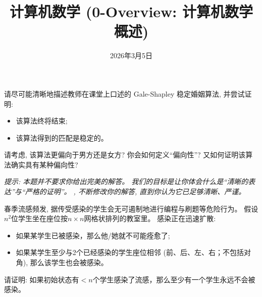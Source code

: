 \documentclass[a4paper, justified]{tufte-handout}
\title{计算机数学 (0-Overview: 计算机数学概述)}
\date{2026年3月5日}
\begin{document}
\maketitle
\noplagiarism %
\begin{abstract}
  \begin{center}{}
  \end{center}
\end{abstract}
\beginrequired
\begin{problem}[稳定婚姻问题]
  请尽可能清晰地描述教师在课堂上口述的 Gale-Shapley 稳定婚姻算法, 并尝试证明:
  \begin{itemize}
    \item 该算法终将结束;
    \item 该算法得到的匹配是稳定的。
  \end{itemize}
  请考虑, 该算法更偏向于男方还是女方? 你会如何定义``偏向性''?
  又如何证明该算法确实具有某种偏向性?

  \vspace{0.30cm}
  {\it 提示: 本题并不要求你给出完美的解答。
  我们的目标是让你体会什么是``清晰的表达''与``严格的证明''。
  , 不断修改你的解答, 直到你认为它已足够清晰、严谨。}
\end{problem}

\begin{solution}
\end{solution}

\begin{problem}
  春季流感频发, 据传受感染的学生会无可遏制地进行编程与刷题等危险行为。
  假设$n^2$位学生坐在座位按$n \times n$网格状排列的教室里。
  感染正在迅速扩散:
  \begin{itemize}
    \item 如果某学生已被感染，那么他/她就不可能痊愈了;
    \item 如果某学生至少与2个已经感染的学生座位相邻 (前、后、左、右；不包括对角),
      那么该学生也会被感染。
  \end{itemize}
  请证明: 如果初始状态有$< n$个学生感染了流感，那么至少有一个学生永远不会被感染。
\end{problem}
\end{document}
